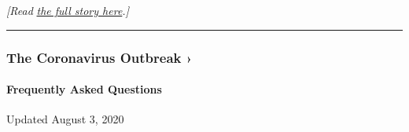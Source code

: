 \emph{{[}Read}
\href{https://www.nytimes.com/2020/08/01/us/coronavirus-midwest-cases-deaths.html}{\emph{the
full story here}}\emph{.{]}}

\begin{center}\rule{0.5\linewidth}{\linethickness}\end{center}

\href{https://www.nytimes.com/news-event/coronavirus?action=click\&pgtype=Article\&state=default\&region=MAIN_CONTENT_3\&context=storylines_faq}{}

\hypertarget{the-coronavirus-outbreak-}{%
\subsubsection{The Coronavirus Outbreak
›}\label{the-coronavirus-outbreak-}}

\hypertarget{frequently-asked-questions}{%
\paragraph{Frequently Asked
Questions}\label{frequently-asked-questions}}

Updated August 3, 2020

